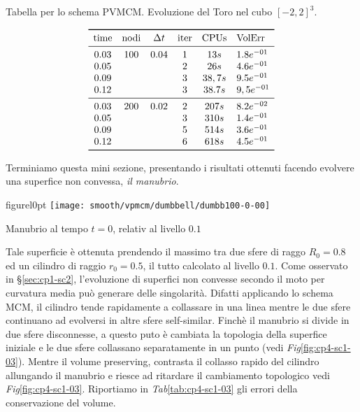 \begin{table}[htb!]
\caption{Tabella per lo schema PVMCM. Evoluzione del Toro nel cubo $[-2,2]^3$.}
\label{tab:cp4-sc1-02}
\[
\begin{array}{*{5}{c}l}
    \toprule
    \text{time} &\text{nodi} &\Delta t &\text{iter} &\text{CPUs}&\text{VolErr} \\
    \midrule
     0.03       & 100        & 0.04    & 1          & 13s      &1.8e^{-01}\\
     0.05       &            &         & 2          & 26s      &4.6e^{-01}\\ 
     0.09       &            &         & 3          & 38,7s    &9.5e^{-01}\\ 
     0.12       &            &         & 3          & 38.7s    &9,5e^{-01}\\
     \midrule
     0.03       & 200        & 0.02    & 2          & 207s     &8.2e^{-02}\\ 
     0.05       &            &         & 3          & 310s     &1.4e^{-01}\\
     0.09       &            &         & 5          & 514s     &3.6e^{-01}\\ 
     0.12       &            &         & 6          & 618s     &4.5e^{-01}\\
    \bottomrule
\end{array}
\]
\end{table}

\newpage

Terminiamo questa mini sezione, presentando i risultati ottenuti
facendo evolvere una superfice non convessa, \emph{il manubrio}.

\begin{wrapfloat}{figure}{l}{0pt}
\texttt{[image: smooth/vpmcm/dumbbell/dumbb100-0-00]}
\caption{Manubrio al tempo $t=0$, relativ al livello $0.1$}
\end{wrapfloat}

Tale superficie è ottenuta prendendo il massimo tra due sfere di raggo
$R_0=0.8$ ed un cilindro di raggio $r_0=0.5$, il tutto calcolato al
livello $0.1$. Come osservato in §\ref{sec:cp1-sc2}, l'evoluzione di
superfici non convesse secondo il moto per curvatura media può
generare delle singolarità. Difatti applicando lo schema MCM, il
cilindro tende rapidamente a collassare in una linea mentre le due
sfere continuano ad evolversi in altre sfere self-similar. Finchè il
manubrio si divide in due sfere disconnesse, a questo puto è cambiata
la topologia della superfice iniziale e le due sfere collassano
separatamente in un punto (vedi \emph{Fig}\ref{fig:cp4-sc1-03}).
Mentre il volume preserving, contrasta il collasso rapido  del
cilindro allungando il manubrio e riesce ad ritardare il cambiamento
topologico vedi \emph{Fig}\ref{fig:cp4-sc1-03}. Riportiamo in \emph{Tab}\ref{tab:cp4-sc1-03}  gli errori
della conservazione del volume.

